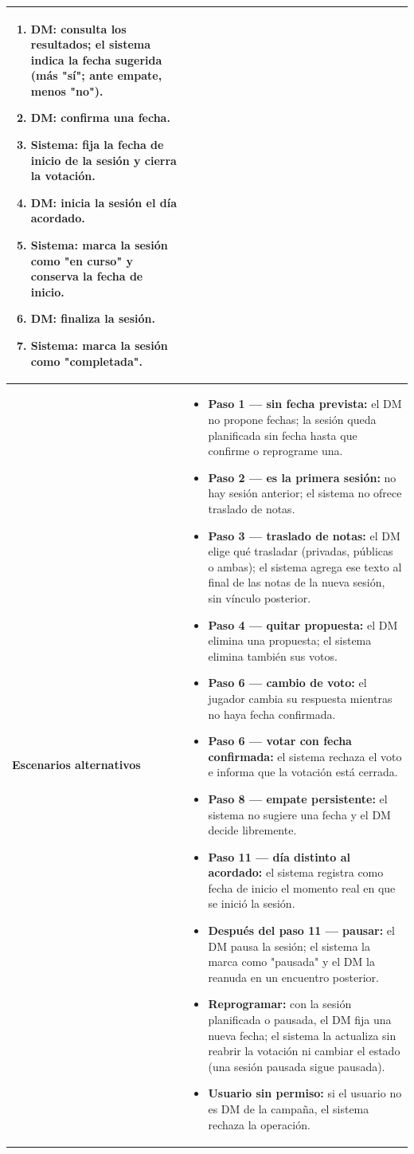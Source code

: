 {\begin{longtable}{|>{\raggedright\arraybackslash\bfseries}p{3.2cm}|>{\raggedright\arraybackslash}p{11.9cm}|}
\begin{enumerate}[itemsep=2pt,topsep=2pt]
\item \textbf{DM:} consulta los resultados; el sistema indica la fecha sugerida (más "sí"; ante empate, menos "no").
\item \textbf{DM:} confirma una fecha.
\item \textbf{Sistema:} fija la fecha de inicio de la sesión y cierra la votación.
\item \textbf{DM:} inicia la sesión el día acordado.
\item \textbf{Sistema:} marca la sesión como "en curso" y conserva la fecha de inicio.
\item \textbf{DM:} finaliza la sesión.
\item \textbf{Sistema:} marca la sesión como "completada".
\end{enumerate} \\ \hline
Escenarios alternativos & \begin{itemize}[itemsep=2pt,topsep=2pt]
\item \textbf{Paso 1 — sin fecha prevista:} el DM no propone fechas; la sesión queda planificada sin fecha hasta que confirme o reprograme una.
\item \textbf{Paso 2 — es la primera sesión:} no hay sesión anterior; el sistema no ofrece traslado de notas.
\item \textbf{Paso 3 — traslado de notas:} el DM elige qué trasladar (privadas, públicas o ambas); el sistema agrega ese texto al final de las notas de la nueva sesión, sin vínculo posterior.
\item \textbf{Paso 4 — quitar propuesta:} el DM elimina una propuesta; el sistema elimina también sus votos.
\item \textbf{Paso 6 — cambio de voto:} el jugador cambia su respuesta mientras no haya fecha confirmada.
\item \textbf{Paso 6 — votar con fecha confirmada:} el sistema rechaza el voto e informa que la votación está cerrada.
\item \textbf{Paso 8 — empate persistente:} el sistema no sugiere una fecha y el DM decide libremente.
\item \textbf{Paso 11 — día distinto al acordado:} el sistema registra como fecha de inicio el momento real en que se inició la sesión.
\item \textbf{Después del paso 11 — pausar:} el DM pausa la sesión; el sistema la marca como "pausada" y el DM la reanuda en un encuentro posterior.
\item \textbf{Reprogramar:} con la sesión planificada o pausada, el DM fija una nueva fecha; el sistema la actualiza sin reabrir la votación ni cambiar el estado (una sesión pausada sigue pausada).
\item \textbf{Usuario sin permiso:} si el usuario no es DM de la campaña, el sistema rechaza la operación.
\end{itemize} \\ \hline
\end{longtable}}
